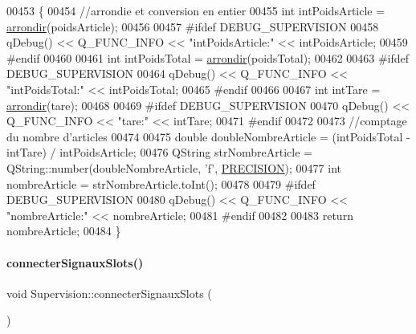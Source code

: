 \begin{DoxyCode}
00453 \{
00454     \textcolor{comment}{//arrondie et conversion en entier}
00455     \textcolor{keywordtype}{int} intPoidsArticle = \hyperlink{class_supervision_a16fde33340a8bc8b0936926cd6dc0657}{arrondir}(poidsArticle);
00456 
00457 \textcolor{preprocessor}{    #ifdef DEBUG\_SUPERVISION}
00458         qDebug() << Q\_FUNC\_INFO << \textcolor{stringliteral}{"intPoidsArticle:"} << intPoidsArticle;
00459 \textcolor{preprocessor}{    #endif}
00460 
00461     \textcolor{keywordtype}{int} intPoidsTotal = \hyperlink{class_supervision_a16fde33340a8bc8b0936926cd6dc0657}{arrondir}(poidsTotal);
00462 
00463 \textcolor{preprocessor}{    #ifdef DEBUG\_SUPERVISION}
00464         qDebug() << Q\_FUNC\_INFO << \textcolor{stringliteral}{"intPoidsTotal:"} << intPoidsTotal;
00465 \textcolor{preprocessor}{    #endif}
00466 
00467     \textcolor{keywordtype}{int} intTare = \hyperlink{class_supervision_a16fde33340a8bc8b0936926cd6dc0657}{arrondir}(tare);
00468 
00469 \textcolor{preprocessor}{    #ifdef DEBUG\_SUPERVISION}
00470         qDebug() << Q\_FUNC\_INFO << \textcolor{stringliteral}{"tare:"} << intTare;
00471 \textcolor{preprocessor}{    #endif}
00472 
00473     \textcolor{comment}{//comptage du nombre d'articles}
00474 
00475     \textcolor{keywordtype}{double} doubleNombreArticle = (intPoidsTotal - intTare) / intPoidsArticle;
00476     QString strNombreArticle = QString::number(doubleNombreArticle, \textcolor{charliteral}{'f'}, 
      \hyperlink{_supervision_8h_a9c7b069fee3c8184e14a7de8e5da2dc6}{PRECISION});
00477     \textcolor{keywordtype}{int} nombreArticle = strNombreArticle.toInt();
00478 
00479 \textcolor{preprocessor}{    #ifdef DEBUG\_SUPERVISION}
00480         qDebug() << Q\_FUNC\_INFO << \textcolor{stringliteral}{"nombreArticle:"} << nombreArticle;
00481 \textcolor{preprocessor}{    #endif}
00482 
00483     \textcolor{keywordflow}{return} nombreArticle;
00484 \}
\end{DoxyCode}
\mbox{\label{class_supervision_ac3bb2f3834b09a81ae9a767502ff693b}} 
\paragraph{\texorpdfstring{connecter\+Signaux\+Slots()}{connecterSignauxSlots()}}
{\footnotesize\ttfamily void Supervision\+::connecter\+Signaux\+Slots (\begin{DoxyParamCaption}{ }\end{DoxyParamCaption})\hspace{0.3cm}{\ttfamily [private]}}




